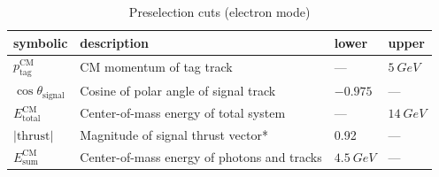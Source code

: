 \documentclass[12pt]{thesis}  %
\begin{document}
\begin{table}[h]
\centering
\begin{tabular}{llll}
\textbf{symbolic} & \textbf{description} & \textbf{lower} & \textbf{upper} \\ \hline
$p_{\text{tag}}^{\text{CM}}$  & CM momentum of tag track & --- & $\SI{5}{GeV}$ \\
$\cos\theta_{\text{signal}}$ & Cosine of polar angle of signal track & $-0.975$ & --- \\
$E_{\text{total}}^{\text{CM}}$ & Center-of-mass energy of total system  & --- & $\SI{14}{GeV}$ \\
$\lvert\text{thrust}\rvert$ & Magnitude of signal thrust vector* & 0.92 & --- \\
$E_{\text{sum}}^{\text{CM}}$ & Center-of-mass energy of photons and tracks & $\SI{4.5}{GeV}$ & ---
\end{tabular}
\caption{Preselection cuts (electron mode)}
\label{my-label}
\end{table}
\end{document}
